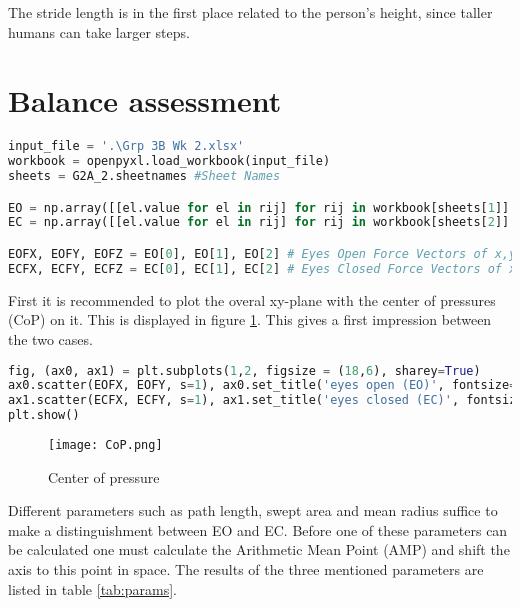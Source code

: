 \documentclass[english, a4paper, 11pt]{article}
\begin{document}
The stride length is in the first place related to the person's height, since taller humans can take larger steps.
\section{Balance assessment}

    \begin{lstlisting}[language=Python, caption=importing balance assessment data, label=code:BA_input]
input_file = '.\Grp 3B Wk 2.xlsx'
workbook = openpyxl.load_workbook(input_file)
sheets = G2A_2.sheetnames #Sheet Names

EO = np.array([[el.value for el in rij] for rij in workbook[sheets[1]].rows])[6:15006,2:].T #First Trial #15006
EC = np.array([[el.value for el in rij] for rij in workbook[sheets[2]].rows])[6:12976,2:].T #Second Trial #12976

EOFX, EOFY, EOFZ = EO[0], EO[1], EO[2] # Eyes Open Force Vectors of x,y,z coordinates
ECFX, ECFY, ECFZ = EC[0], EC[1], EC[2] # Eyes Closed Force Vectors of x,y,z coordinates
    \end{lstlisting}

    First it is recommended to plot the overal xy-plane with the center of pressures (CoP) on it. This is displayed in figure \ref*{fig:CoP}.
    This gives a first impression between the two cases.

    \begin{lstlisting}[language=Python, caption=plotting CoP]
fig, (ax0, ax1) = plt.subplots(1,2, figsize = (18,6), sharey=True)
ax0.scatter(EOFX, EOFY, s=1), ax0.set_title('eyes open (EO)', fontsize=15), ax0.set_xlabel('x-coordinate in mm', fontsize=15), ax0.set_ylabel('y-coordinate in mm', fontsize=15)
ax1.scatter(ECFX, ECFY, s=1), ax1.set_title('eyes closed (EC)', fontsize=15), ax1.set_xlabel('x-coordinate in mm', fontsize=15)
plt.show()
    \end{lstlisting}

    \begin{figure}[!h]
        \centering
        \texttt{[image: CoP.png]}
        \caption{Center of pressure}
        \label{fig:CoP}
    \end{figure}

    Different parameters such as path length, swept area and mean radius suffice to make a distinguishment between EO and EC.
    Before one of these parameters can be calculated one must calculate the Arithmetic Mean Point (AMP) and shift the axis
    to this point in space. The results of the three mentioned parameters are listed in table \ref*{tab:params}.
\end{document}
